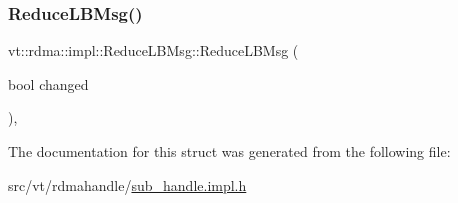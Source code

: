 \subsubsection{\texorpdfstring{Reduce\+L\+B\+Msg()}{ReduceLBMsg()}}
{\footnotesize\ttfamily vt\+::rdma\+::impl\+::\+Reduce\+L\+B\+Msg\+::\+Reduce\+L\+B\+Msg (\begin{DoxyParamCaption}\item[{bool}]{changed }\end{DoxyParamCaption})\hspace{0.3cm}{\ttfamily [inline]}, {\ttfamily [explicit]}}



The documentation for this struct was generated from the following file\+:\begin{DoxyCompactItemize}
\item 
src/vt/rdmahandle/\hyperlink{sub__handle_8impl_8h}{sub\+\_\+handle.\+impl.\+h}\end{DoxyCompactItemize}
